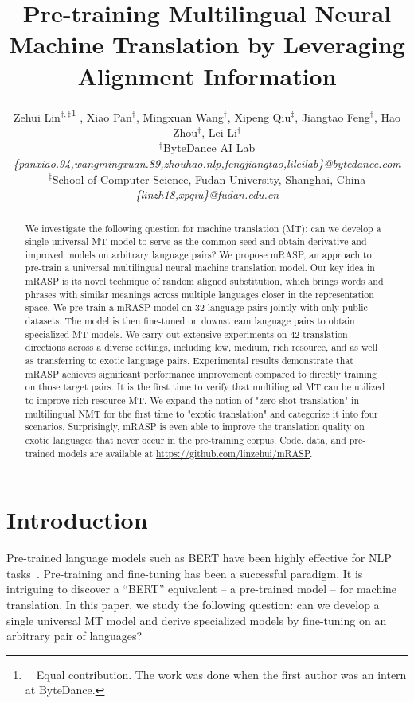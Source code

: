 \documentclass[11pt,a4paper]{article}
\title{Pre-training Multilingual Neural Machine Translation by Leveraging Alignment Information}
\author{Zehui Lin$^{\dagger,\ddagger}$\thanks{\ \ Equal contribution. The work was done when the first author was an intern at ByteDance.} , 
Xiao Pan$^\dagger$\footnotemark[1] , 
Mingxuan Wang$^\dagger$, 
Xipeng Qiu$^\ddagger$,
Jiangtao Feng$^\dagger$,
Hao Zhou$^\dagger$,
Lei Li$^\dagger$ \\
  $^\dagger$ByteDance AI Lab \\
  \textit{\{panxiao.94,wangmingxuan.89,zhouhao.nlp,fengjiangtao,lileilab\}@bytedance.com} \\
  $^\ddagger$School of Computer Science, Fudan University, Shanghai, China \\
  \textit{\{linzh18,xpqiu\}@fudan.edu.cn} \\
  }
\date{}
\newcommand{\method}{mRASP\xspace}
\begin{document}
\maketitle


\begin{abstract}


We investigate the following question for machine translation (MT):
can we develop a single universal MT model to serve as the common seed and obtain derivative and improved models on arbitrary language pairs?
We propose \method, an approach to pre-train a universal multilingual neural machine translation model.
Our key idea in \method is its novel technique of random aligned substitution, which brings words and phrases with similar meanings across multiple languages closer in the representation space. 
We pre-train a \method model on 32 language pairs jointly with only public datasets. 
The model is then fine-tuned on downstream language pairs to obtain specialized MT models.
We carry out extensive experiments on 42 translation directions across a diverse settings, including low, medium, rich resource, and as well as transferring to exotic language pairs.  
Experimental results demonstrate that \method
 achieves significant performance improvement
 compared to directly training on those target pairs. 
It is the first time to verify that multilingual MT can be utilized to improve rich resource MT.
We expand the notion of "zero-shot translation" in multilingual NMT for the first time to "exotic translation" and categorize it into four scenarios.
Surprisingly, \method is even able to improve the translation quality on exotic languages that never occur in the pre-training corpus. 
Code, data, and pre-trained models are available at \url{https://github.com/linzehui/mRASP}.



%
 \end{abstract}

\section{Introduction}
\label{sec:intro}


Pre-trained language models such as BERT have been highly effective for NLP tasks~\cite{DBLP:conf/naacl/PetersNIGCLZ18,DBLP:conf/naacl/DevlinCLT19,radford2019language,DBLP:conf/nips/ConneauL19,Liu2019RoBERTaAR,DBLP:conf/nips/YangDYCSL19}.
Pre-training and fine-tuning has been a successful paradigm. 
It is intriguing to discover a ``BERT'' equivalent -- a pre-trained model -- for machine translation. 
In this paper, we study the following question: 
can we develop a single universal MT model and derive specialized models by fine-tuning on an arbitrary pair of languages?
\end{document}
